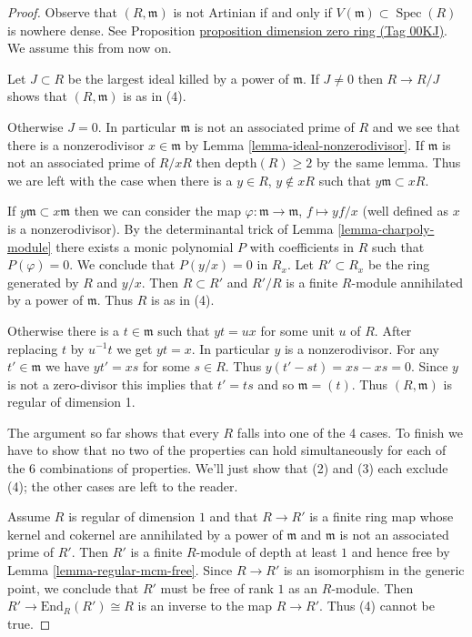 \documentclass{amsart}
\theoremstyle{plain}
\theoremstyle{definition}
\theoremstyle{remark}
\numberwithin{equation}{subsection}
\def\Spec{\mathop{\mathrm{Spec}}}
\begin{document}
\begin{proof}
Observe that $(R, \mathfrak m)$ is not Artinian if and only if
$V(\mathfrak m) \subset \Spec(R)$ is nowhere dense. See
Proposition \href{https://stacks.math.columbia.edu/tag/00KJ}{proposition dimension zero ring (Tag 00KJ)}. We assume this from now on.

\medskip\noindent
Let $J \subset R$ be the largest ideal killed by a power of $\mathfrak m$.
If $J \not = 0$ then $R \to R/J$ shows that $(R, \mathfrak m)$
is as in (4).

\medskip\noindent
Otherwise $J = 0$. In particular $\mathfrak m$ is not an associated prime
of $R$ and we see that there is a nonzerodivisor $x \in \mathfrak m$ by
Lemma \ref{lemma-ideal-nonzerodivisor}. If $\mathfrak m$
is not an associated prime of $R/xR$ then $\text{depth}(R) \geq 2$
by the same lemma. Thus we are left with the case when there is a
$y \in R$, $y \not \in xR$ such that $y \mathfrak m \subset xR$.

\medskip\noindent
If $y \mathfrak m \subset x \mathfrak m$ then we can consider the
map $\varphi : \mathfrak m \to \mathfrak m$, $f \mapsto yf/x$
(well defined as $x$ is a nonzerodivisor). By the determinantal trick
of Lemma \ref{lemma-charpoly-module} there exists a monic
polynomial $P$ with coefficients in $R$ such that $P(\varphi) = 0$.
We conclude that $P(y/x) = 0$ in $R_x$.
Let $R' \subset R_x$ be the ring generated by
$R$ and $y/x$. Then $R \subset R'$ and $R'/R$ is a finite $R$-module
annihilated by a power of $\mathfrak m$. Thus $R$ is as in (4).

\medskip\noindent
Otherwise there is a $t \in \mathfrak m$ such that $y t = u x$
for some unit $u$ of $R$. After replacing $t$ by $u^{-1}t$
we get $yt = x$. In particular $y$ is a nonzerodivisor.
For any $t' \in \mathfrak m$ we have $y t' = x s$ for some $s \in R$.
Thus $y (t' - s t ) = x s - x s = 0$.
Since $y$ is not a zero-divisor this implies that $t' = ts$ and so
$\mathfrak m = (t)$. Thus $(R, \mathfrak m)$ is regular of dimension 1.

\medskip\noindent
The argument so far shows that every $R$ falls into one of the 4 cases.
To finish we have to show that no two of the properties can hold
simultaneously for each of the 6 combinations of properties. We'll
just show that (2) and (3) each exclude (4); the other cases are left
to the reader.

\medskip\noindent
Assume $R$ is regular of dimension $1$ and that $R \to R'$ is a finite
ring map whose kernel and cokernel are annihilated by a power of $\mathfrak m$
and $\mathfrak m$ is not an associated prime of $R'$. Then $R'$
is a finite $R$-module of depth at least $1$ and hence free by
Lemma \ref{lemma-regular-mcm-free}. Since $R \to R'$ is an isomorphism
in the generic point, we conclude that $R'$ must be free of rank $1$
as an $R$-module. Then $R' \to \text{End}_R(R') \cong R$ is an inverse
to the map $R \to R'$. Thus (4) cannot be true.


\end{proof}
\end{document}
